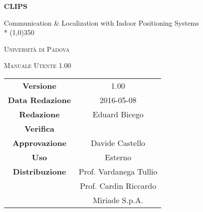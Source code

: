 \documentclass[a4paper,12pt]{article}
\author{Eduard Bicego}
\date{08/05/2016}
\begin{document}
\begin{titlepage}
	\centering
	{\huge\bfseries CLIPS\par}
	Communication \& Localization with Indoor Positioning Systems \\*
	\line(1,0){350} \\
	{\scshape\LARGE Università di Padova \par}
	\vspace{1cm}
	{\scshape\Large Manuale Utente 1.00 \par}
	\logo
	\newpage
	\begin{tabular}{c|c}
		{\hfill \textbf{Versione}} 			& 1.00					\\
		{\hfill\textbf{Data Redazione}} 		& 2016-05-08  		\\
		{\hfill\textbf{Redazione}} 			& Eduard Bicego			\\
		{\hfill\textbf{Verifica}} 				&  					\\
		{\hfill\textbf{Approvazione}} 		& Davide Castello		\\
		{\hfill\textbf{Uso}} 					& Esterno			\\
		{\hfill\textbf{Distribuzione}} 			& Prof. Vardanega Tullio \\
												& Prof. Cardin Riccardo \\
												& Miriade S.p.A. 		\\
	\end{tabular}
\end{titlepage}
	
	\newpage
	\pagestyle{myfront}
	
		\newpage
			
		\newpage
			\tableofcontents
		\newpage
			\listoffigures
	\label{LastFrontPage}

	\newpage
		\pagestyle{mymain}
	\newpage
		
	\newpage
		
	\newpage
		
	\newpage
		


		
	\label{LastPage}
\end{document}
